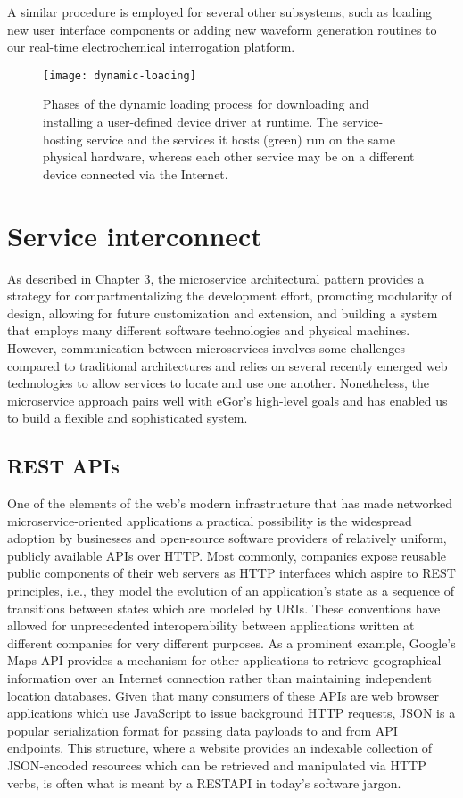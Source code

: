 \documentclass[../thesis]{subfiles}
\begin{document}
A similar procedure is employed for several other
subsystems, such as loading new user interface components or adding
new waveform generation routines to our real-time electrochemical
interrogation platform.

\begin{figure}
  \texttt{[image: dynamic-loading]}
  \caption{
    Phases of the dynamic loading process for downloading and
    installing a user-defined device driver at runtime. The
    service-hosting service and the services it hosts (green)
    run on the same physical hardware, whereas each other service may
    be on a different device connected via the Internet.
    \label{fig:DynamicLoading}
  }
\end{figure}




\section{Service interconnect}
As described in Chapter 3, the microservice architectural pattern
provides a strategy for compartmentalizing the development effort,
promoting modularity of design, allowing for future customization and
extension, and building a system that employs many different software
technologies and physical machines. However, communication between
microservices involves some challenges compared to traditional
architectures and relies on several recently emerged web technologies
to allow services to locate and use one another. Nonetheless,
the microservice approach pairs well with eGor's high-level goals and
has enabled us to build a flexible and sophisticated system.

\subsection{REST APIs}
One of the elements of the web's modern infrastructure that has made
networked microservice-oriented applications a practical possibility
is the widespread adoption by businesses and open-source software
providers of relatively uniform, publicly available \glspl{API} over
HTTP. Most commonly, companies expose reusable public components of
their web servers as HTTP interfaces which aspire to \gls{REST}
principles, i.e., they model the evolution of an application's state
as a sequence of transitions between states which are modeled by
\glspl{URI}. These conventions have allowed for unprecedented
interoperability between applications written at different companies
for very different purposes. As a prominent example, Google's Maps
\gls{API} provides a mechanism for other applications to retrieve
geographical information over an Internet connection rather than
maintaining independent location databases. Given that many consumers
of these APIs are web browser applications which use JavaScript to
issue background HTTP requests, \gls{JSON} is a popular serialization
format for passing data payloads to and from API endpoints. This
structure, where a website provides an indexable collection of
\gls{JSON}-encoded resources which can be retrieved and manipulated
via HTTP verbs, is often what is meant by a \gls{RESTAPI} in today's
software jargon.
\end{document}
